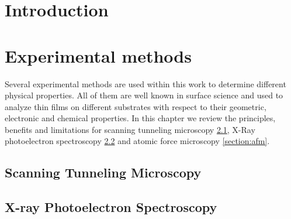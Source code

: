 \documentclass[
twoside,				%
BCOR=12mm,				%
headings=normal,		%
headsepline,			%
footsepline,			%
plainfootsepline,		%
]{scrbook}
\begin{document}

 \frontmatter{}			 														%
 \setcounter{tocdepth}{2}														%
	\tableofcontents{}														 	%
%
\mainmatter{}
\chapter{Introduction}


\chapter{Experimental methods}
Several experimental methods are used within this work to determine different physical properties. All of them are well known in surface science and used to analyze thin films on different substrates with respect to their geometric, electronic and chemical properties.
In this chapter we review the principles, benefits and limitations for scanning tunneling microscopy \ref{section:stm}, X-Ray photoelectron spectroscopy \ref{section:xps} and atomic force microscopy \ref{section:afm}. 

  \section{\textbf{S}canning \textbf{T}unneling \textbf{M}icroscopy}
  \label{section:stm}
    
  \section{\textbf{X}-ray \textbf{P}hotoelectron \textbf{S}pectroscopy}
  \label{section:xps}
	
\end{document}
